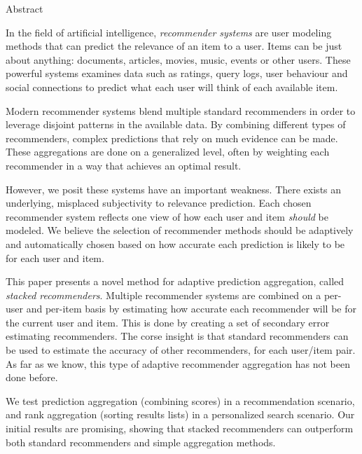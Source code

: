 \null\vspace{3em}
{
  \centering
  \normalfont
  \huge
  Abstract\\
}
\vspace{2em}

\noindent
In the field of artificial intelligence,
\emph{recommender systems} are user modeling methods
that can predict the relevance of an item to a user.
Items can be just about anything: 
documents, articles, movies, music, events or other users.
These powerful systems examines data such as ratings, query logs,
user behaviour and social connections to predict
what each user will think of each available item.

Modern recommender systems blend multiple standard recommenders
in order to leverage disjoint patterns in the available data.
By combining different types of recommenders,
complex predictions that rely on much evidence can be made.
These aggregations are done on a generalized level,
often by weighting each recommender in a way
that achieves an optimal result.

However, we posit these systems have an important weakness.
There exists an underlying, misplaced subjectivity to relevance prediction.
Each chosen recommender system reflects one view of 
how each user and item \emph{should} be modeled.
We believe the selection of recommender methods should 
be adaptively and automatically chosen based on
how accurate each prediction is likely to be for each user and item.

This paper presents a novel method for adaptive prediction aggregation,
called \emph{stacked recommenders}.
Multiple recommender systems are combined on a per-user and per-item basis
by estimating how accurate each recommender will be for the current user and item.
This is done by creating a set of secondary error estimating recommenders.
The corse insight is that standard recommenders can be used
to estimate the accuracy of other recommenders, for each
user/item pair.
As far as we know, this type of adaptive recommender aggregation
has not been done before.

We test prediction aggregation (combining scores) in a
recommendation scenario,
and rank aggregation (sorting results lists) in a personalized search scenario.
Our initial results are promising, showing that stacked recommenders
can outperform both standard recommenders and simple aggregation methods.

\clearpage
